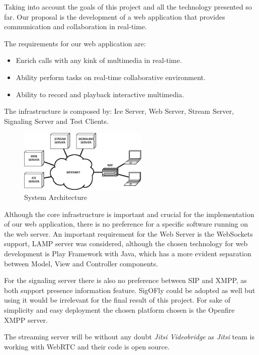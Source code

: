 Taking into account the goals of this project and all the technology presented so far. Our proposal is the development of a web application that provides communication and collaboration in real-time.

The requirements for our web application are:

\begin{itemize}
 \item Enrich calls with any kink of multimedia in real-time.
 \item Ability perform tasks on real-time collaborative environment.
 \item Ability to record and playback interactive multimedia.
\end{itemize}

The infrastructure is composed by: Ice Server, Web Server, Stream Server, Signaling Server and Test Clients.

\begin{figure}[H]
	\centering
	\includegraphics[width=0.55\textwidth]{figures/arch.png}
	\caption{System Architecture}
\end{figure}

Although the core infrastructure is important and crucial for the implementation of our web application, there is no preference for a specific software running on the web server. An important requirement for the Web Server is the WebSockets support, LAMP server was considered, although the chosen technology for web development is Play Framework with Java, which has a more evident separation between Model, View and Controller components.

For the signaling server there is also no preference between \ac{SIP} and \ac{XMPP}, as both support presence information feature. SigOFly could be adopted as well but using it would be irrelevant for the final result of this project. For sake of simplicity and easy deployment the chosen platform chosen is the Openfire \ac{XMPP} server.

The streaming server will be without any doubt \emph{Jitsi Videobridge} as \emph{Jitsi} team is working with \ac{WebRTC} and their code is open source.

